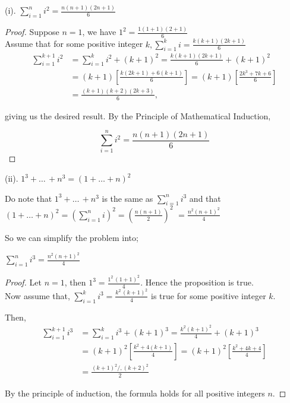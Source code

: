 \documentclass[11pt]{amsart}
\begin{document}
(i). $\sum_{i=1}^{n} i^2 = \frac{n(n+1)(2n+1)}{6}$

\begin{proof}
	Suppose $n=1$, we have $1^2 = \frac{1(1+1)(2+1)}{6}$ \\

	Assume that for some positive integer $k, \sum_{i=1}^{k} i = \frac{k(k+1)(2k+1)}{6}$ \\

	\begin{align*}
		\sum_{i=1}^{k+1} i^2 &= \sum_{i=1}^{k} i^2 + (k+1)^2 = \frac{k(k+1)(2k+1)}{6} + (k+1)^2 \\
		&= (k+1)\left[\frac{k(2k+1)+6(k+1)}{6}\right] = (k+1)\left[\frac{2k^3 +7k + 6}{6}\right] \\
		&= \frac{(k+1)(k+2)(2k+3)}{6},
	\end{align*}

	giving us the desired result. By the Principle of Mathematical Induction,

	\[
		\sum_{i=1}^{n} i^2 = \frac{n(n+1)(2n+1)}{6}
	\]
\end{proof}

(ii). $1^3 + \dots \, + n^3 = \left(1 + \dots + n\right)^2$

\bigskip

Do note that $1^3 + \dots \, + n^3$ is the same as $\sum_{i=1}^n i^3$ and that\\

$\left(1 + \dots + n\right)^2 = \left(\sum_{i=1}^n i\right)^2 = \left(\frac{n(n+1)}{2}\right)^2$
$= \frac{n^2(n+1)^2}{4}$ \\

\medskip

So we can simplify the problem into;

\medskip

$\sum_{i=1}^n i^3 = \frac{n^2(n+1)^2}{4}$ \\

\begin{proof}
	Let $n=1$, then $1^3 = \frac{1^2 \, (1+1)^2}{4}$. Hence the proposition is true.\\

	Now assume that, $\sum_{i=1}^{k} i^3 = \frac{k^2\,(k+1)^2}{4}$ is true for some positive integer $k$.

	Then,\\

	\begin{align*}
		\sum_{i=1}^{k+1} i^3 &= \sum_{i=1}^{k} i^3 + (k+1)^3 = \frac{k^2 (k+1)^2}{4} + (k+1)^3 \\
				     &= (k+1)^2 \left[\frac{k^2 + 4(k+1)}{4}\right] = (k+1)^2\left[\frac{k^2 + 4k + 4}{4}\right]\\
		&= \frac{(k+1)^2/,(k+2)^2}{2}
	\end{align*}

	By the principle of induction, the formula holds for all positive integers $n$.
\end{proof}
\end{document}
